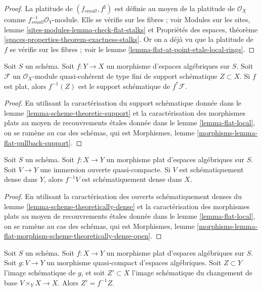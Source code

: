 \begin{proof}
La platitude de $(f_{small}, f^\sharp)$ est définie au moyen de la
platitude de $\mathcal{O}_X$ comme $f_{small}^{-1}\mathcal{O}_Y$-module.
Elle se vérifie sur les fibres ; voir
Modules sur les sites, lemme \ref{sites-modules-lemma-check-flat-stalks}
et
Propriétés des espaces, théorème \ref{spaces-properties-theorem-exactness-stalks}.
Or on a déjà vu que la platitude de $f$ se vérifie sur les fibres ; voir le
lemme \ref{lemma-flat-at-point-etale-local-rings}.
\end{proof}

\begin{lemma}
\label{lemma-flat-pullback-support}
Soit $S$ un schéma. Soit $f : Y \to X$ un morphisme d'espaces algébriques
sur $S$. Soit $\mathcal{F}$ un $\mathcal{O}_X$-module quasi-cohérent
de type fini de support schématique $Z \subset X$.
Si $f$ est plat, alors $f^{-1}(Z)$ est le support schématique de
$f^*\mathcal{F}$.
\end{lemma}

\begin{proof}
En utilisant la caractérisation du support schématique
donnée dans le lemme \ref{lemma-scheme-theoretic-support}
et la caractérisation des morphismes plats au moyen de
recouvrements étales donnée dans le lemme \ref{lemma-flat-local},
on se ramène au cas des schémas, qui est
Morphismes, lemme \ref{morphisms-lemma-flat-pullback-support}.
\end{proof}

\begin{lemma}
\label{lemma-flat-morphism-scheme-theoretically-dense-open}
Soit $S$ un schéma.
Soit $f : X \to Y$ un morphisme plat d'espaces algébriques sur $S$.
Soit $V \to Y$ une immersion ouverte quasi-compacte. Si $V$
est schématiquement dense dans $Y$, alors $f^{-1}V$
est schématiquement dense dans $X$.
\end{lemma}

\begin{proof}
En utilisant la caractérisation des ouverts schématiquement denses
du lemme \ref{lemma-scheme-theoretically-dense}
et la caractérisation des morphismes plats au moyen de
recouvrements étales donnée dans le lemme \ref{lemma-flat-local},
on se ramène au cas des schémas, qui est
Morphismes, lemme
\ref{morphisms-lemma-flat-morphism-scheme-theoretically-dense-open}.
\end{proof}

\begin{lemma}
\label{lemma-flat-base-change-scheme-theoretic-image}
Soit $S$ un schéma. Soit $f : X \to Y$ un morphisme plat d'espaces algébriques
sur $S$. Soit $g : V \to Y$ un morphisme quasi-compact d'espaces algébriques.
Soit $Z \subset Y$ l'image schématique de $g$, et soit $Z' \subset X$
l'image schématique du changement de base $V \times_Y X \to X$.
Alors $Z' = f^{-1}Z$.
\end{lemma}

